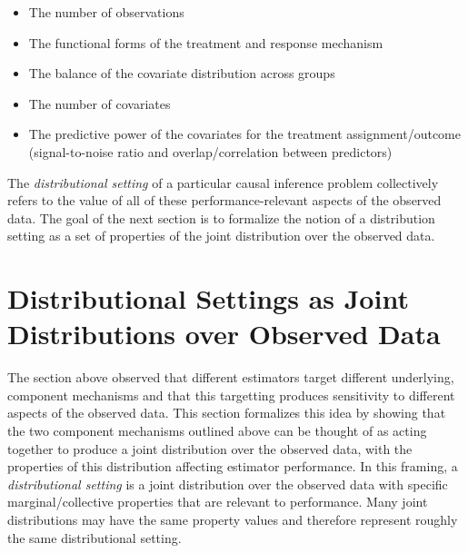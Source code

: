 \documentclass[../main.tex]{subfiles}
\begin{document}
\vspace{\baselineskip}
\begin{itemize}
	\item The number of observations\par

	\item The functional forms of the treatment and response mechanism\par

	\item The balance of the covariate distribution across groups\par

	\item The number of covariates\par

	\item The predictive power of the covariates for the treatment assignment/outcome (signal-to-noise ratio and overlap/correlation between predictors)
\end{itemize}\par


\vspace{\baselineskip}
The \textit{distributional setting} of a particular causal inference problem collectively refers to the value of all of these performance-relevant aspects of the observed data. The goal of the next section is to formalize the notion of a distribution setting as a set of properties of the joint distribution over the observed data.

\section{Distributional Settings as Joint Distributions over Observed Data}

\vspace{\baselineskip}
The section above observed that different estimators target different underlying, component mechanisms and that this targetting produces sensitivity to different aspects of the observed data. This section formalizes this idea by showing that the two component mechanisms outlined above can be thought of as acting together to produce a joint distribution over the observed data, with the properties of this distribution affecting estimator performance. In this framing, a \textit{distributional setting }is a joint distribution over the observed data with specific marginal/collective properties that are relevant to performance. Many joint distributions may have the same property values and therefore represent roughly the same distributional setting.\par
\end{document}
